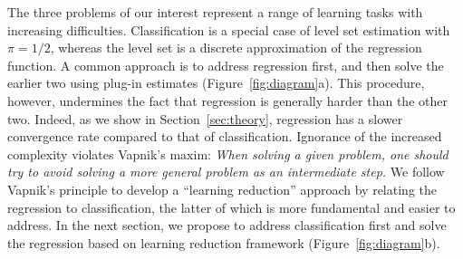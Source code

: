 \documentclass[11pt]{article}
\theoremstyle{definition}
\begin{document}


The three problems of our interest represent a range of learning tasks with increasing difficulties. Classification is a special case of level set estimation with $\pi=1/2$, whereas the level set is a discrete approximation of the regression function. A common approach is to address regression first, and then solve the earlier two using plug-in estimates (Figure~\ref{fig:diagram}a). This procedure, however, undermines the fact that regression is generally harder than the other two. Indeed, as we show in Section~\ref{sec:theory}, regression has a slower convergence rate compared to that of classification. 
Ignorance of the increased complexity violates Vapnik’s maxim: \emph{When solving a given problem, one should try to avoid solving a more general problem as an intermediate step.}  We follow Vapnik's principle to develop a ``learning reduction'' approach by relating the regression to classification, the latter of which is more fundamental and easier to address. In the next section, we propose to address classification first and solve the regression based on learning reduction framework (Figure~\ref{fig:diagram}b).
\end{document}
